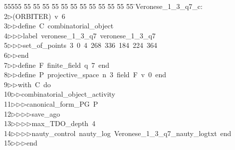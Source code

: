 %
%
\begin{tabbing}
55555 \= 55 \= 55 \= 55 \= 55 \= 55 \= 55 \= 55 \= 55 \= 55 \= 55 \= 55 \= 55 \= \>Veronese\_1\_3\_q7\_c:\ \\[0pt]
2\>$\triangleright$\>(ORBITER)\ v\ 6\ \\[0pt]
3\>$\triangleright$\>$\triangleright$\>define\ C\ combinatorial\_object\ \\[0pt]
4\>$\triangleright$\>$\triangleright$\>$\triangleright$\>label\ veronese\_1\_3\_q7\ veronese\_1\_3\_q7\ \\[0pt]
5\>$\triangleright$\>$\triangleright$\>$\triangleright$\>set\_of\_points\ 3\ 0\ 4\ 268\ 336\ 184\ 224\ 364\ \\[0pt]
6\>$\triangleright$\>$\triangleright$\>end\ \\[0pt]
7\>$\triangleright$\>$\triangleright$\>define\ F\ finite\_field\ q\ 7\ end\ \\[0pt]
8\>$\triangleright$\>$\triangleright$\>define\ P\ projective\_space\ n\ 3\ field\ F\ v\ 0\ end\ \\[0pt]
9\>$\triangleright$\>$\triangleright$\>with\ C\ do\ \\[0pt]
10\>$\triangleright$\>$\triangleright$\>combinatorial\_object\_activity\ \\[0pt]
11\>$\triangleright$\>$\triangleright$\>$\triangleright$\>canonical\_form\_PG\ P\ \\[0pt]
12\>$\triangleright$\>$\triangleright$\>$\triangleright$\>$\triangleright$\>save\_ago\ \\[0pt]
13\>$\triangleright$\>$\triangleright$\>$\triangleright$\>$\triangleright$\>max\_TDO\_depth\ 4\ \\[0pt]
14\>$\triangleright$\>$\triangleright$\>$\triangleright$\>$\triangleright$\>nauty\_control\ nauty\_log\ Veronese\_1\_3\_q7\_nauty\_logtxt\ end\ \\[0pt]
15\>$\triangleright$\>$\triangleright$\>$\triangleright$\>end\ \\[0pt]

\end{tabbing}
